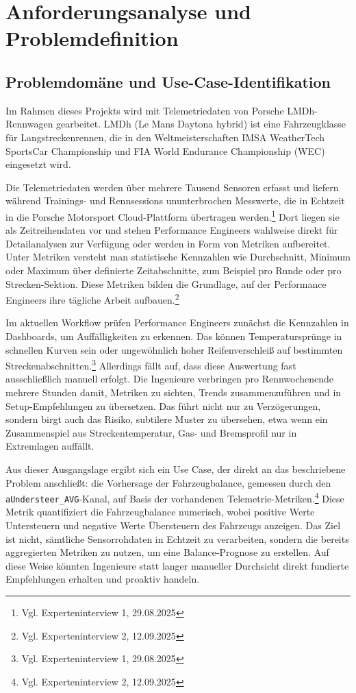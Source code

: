 \chapter{Anforderungsanalyse und Problemdefinition}

\section{Problemdomäne und Use-Case-Identifikation}

Im Rahmen dieses Projekts wird mit Telemetriedaten von Porsche LMDh-Rennwagen gearbeitet. LMDh (Le Mans Daytona hybrid) ist eine Fahrzeugklasse für Langstreckenrennen, die in den Weltmeisterschaften IMSA WeatherTech SportsCar Championship und FIA World Endurance Championship (WEC) eingesetzt wird. 

Die Telemetriedaten werden über mehrere Tausend Sensoren erfasst und liefern während Trainings- und Rennsessions ununterbrochen Messwerte, die in Echtzeit in die Porsche Motorsport Cloud-Plattform übertragen werden.\footnote{Vgl. Experteninterview 1, 29.08.2025} Dort liegen sie als Zeitreihendaten vor und stehen Performance Engineers wahlweise direkt für Detailanalysen zur Verfügung oder werden in Form von Metriken aufbereitet. Unter Metriken versteht man statistische Kennzahlen wie Durchschnitt, Minimum oder Maximum über definierte Zeitabschnitte, zum Beispiel pro Runde oder pro Strecken-Sektion. Diese Metriken bilden die Grundlage, auf der Performance Engineers ihre tägliche Arbeit aufbauen.\footnote{Vgl. Experteninterview 2, 12.09.2025}

Im aktuellen Workflow prüfen Performance Engineers zunächst die Kennzahlen in Dashboards, um Auffälligkeiten zu erkennen. Das können Temperatursprünge in schnellen Kurven sein oder ungewöhnlich hoher Reifenverschleiß auf bestimmten Streckenabschnitten.\footnote{Vgl. Experteninterview 1, 29.08.2025} Allerdings fällt auf, dass diese Auswertung fast ausschließlich manuell erfolgt. Die Ingenieure verbringen pro Rennwochenende mehrere Stunden damit, Metriken zu sichten, Trends zusammenzuführen und in Setup-Empfehlungen zu übersetzen. Das führt nicht nur zu Verzögerungen, sondern birgt auch das Risiko, subtilere Muster zu übersehen, etwa wenn ein Zusammenspiel aus Streckentemperatur, Gas- und Bremsprofil nur in Extremlagen auffällt.

Aus dieser Ausgangslage ergibt sich ein Use Case, der direkt an das 
beschriebene Problem anschließt: die Vorhersage der Fahrzeugbalance, 
gemessen durch den \texttt{aUndersteer\_AVG}-Kanal, auf Basis der 
vorhandenen Telemetrie-Metriken.\footnote{Vgl. Experteninterview 2, 
12.09.2025} Diese Metrik quantifiziert die Fahrzeugbalance numerisch, 
wobei positive Werte Untersteuern und negative Werte Übersteuern des 
Fahrzeugs anzeigen. Das Ziel ist nicht, sämtliche Sensorrohdaten in 
Echtzeit zu verarbeiten, sondern die bereits aggregierten Metriken zu 
nutzen, um eine Balance-Prognose zu erstellen. Auf diese Weise könnten 
Ingenieure statt langer manueller Durchsicht direkt fundierte 
Empfehlungen erhalten und proaktiv handeln.

